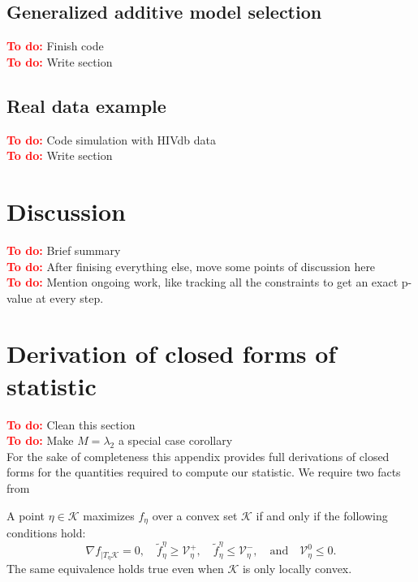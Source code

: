 \documentclass{imsart}
\newcommand{\todo}{\textcolor{red}{\textbf{To do: }}}
\newcommand{\grad}{\nabla}
\newcommand{\V}{\mathcal{V}}\endlocaldefs
\newcommand{\K}{\mathcal{K}}
\newcommand\tf{\widetilde{f}}
\begin{document}
\subsection{Generalized additive model selection}
\todo Finish code \\
\todo Write section \\

\subsection{Real data example}
\todo Code simulation with HIVdb data \\
\todo Write section \\



\section{Discussion}
\label{sec:discuss}

\todo Brief summary \\
\todo After finising everything else, move some points of discussion
here \\
\todo Mention ongoing work, like tracking all the constraints to
get an exact p-value at every step. \\

\newpage


%


\newpage

\appendix
\section{Derivation of closed forms of statistic}

\todo Clean this section \\
\todo Make $M=\lambda_2$ a special case corollary \\

For the sake of completeness this appendix provides full derivations
of closed forms for the quantities required to compute our
statistic. We require two facts from \cite{tests:adaptive}

A point $\eta \in \K$ maximizes $f_\eta$ over a convex
set $\K$ if and only if the following conditions hold: 
\begin{equation}
\label{eq:maxcond}
\grad f_{|T_{\eta}\K} = 0, \quad
\tf^{\eta}_{\eta} \geq \V^+_{\eta}, \quad
\tf^{\eta}_{\eta} \leq \V^-_{\eta}, \quad \text{and} \quad
\V^0_{\eta} \leq 0.
\end{equation}
The same equivalence holds true even when $\K$ is only locally
convex. 
\end{document}
